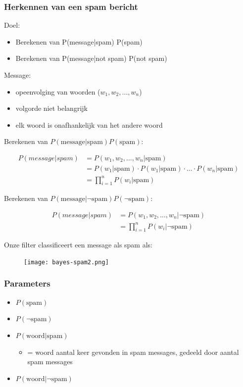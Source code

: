 \documentclass{article}
\begin{document}
\subsubsection{Herkennen van een spam bericht}

Doel:

\begin{itemize}
    \item Berekenen van P(message|spam) P(spam)
    \item Berekenen van P(message|not spam) P(not spam)
\end{itemize}

Message:

\begin{itemize}
    \item opeenvolging van woorden ($w_1, w_2, \dots, w_n$)
    \item volgorde niet belangrijk
    \item elk woord is onafhankelijk van het andere woord
\end{itemize}

Berekenen van $P(\text{message}|\text{spam}) P(\text{spam})$:

\begin{align*}
    P(message|spam) & = P(w_1, w_2, \dots, w_n | \text{spam})\\
    & = P(w_1 | \text{spam}) \cdot P(w_1 | \text{spam}) \cdot \dots \cdot P(w_n | \text{spam})\\
    & = \prod_{i=1}^n P(w_i | \text{spam})
\end{align*}

Berekenen van $P(\text{message}|\neg \text{spam}) P(\neg \text{spam})$:

\begin{align*}
    P(message|spam) & = P(w_1, w_2, \dots, w_n |\neg \text{spam})\\
    & = \prod_{i=1}^n P(w_i | \neg \text{spam})
\end{align*}

Onze filter classificeert een message als spam als:

\begin{figure}[H]
    \centering
    \texttt{[image: bayes-spam2.png]}
\end{figure}

\subsubsection{Parameters}

\begin{itemize}
    \item $P(\text{spam})$
    \item $P(\neg \text{spam})$
    \item $P(\text{woord}|\text{spam})$
    \begin{itemize}
        \item = woord aantal keer gevonden in spam messages, gedeeld door aantal spam messages
    \end{itemize}
    \item $P(\text{woord}|\neg \text{spam})$
\end{itemize}
\end{document}
